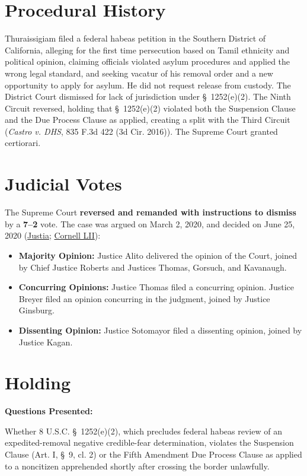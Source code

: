 \documentclass[12pt]{article}
\begin{document}
\section{Procedural History}
Thuraissigiam filed a federal habeas petition in the Southern District of California, alleging for the first time persecution based on Tamil ethnicity and political opinion, claiming officials violated asylum procedures and applied the wrong legal standard, and seeking vacatur of his removal order and a new opportunity to apply for asylum. He did not request release from custody. The District Court dismissed for lack of jurisdiction under \S\ 1252(e)(2). The Ninth Circuit reversed, holding that \S\ 1252(e)(2) violated both the Suspension Clause and the Due Process Clause as applied, creating a split with the Third Circuit (\textit{Castro v. DHS}, 835 F.3d 422 (3d Cir. 2016)). The Supreme Court granted certiorari.

\section{Judicial Votes}
The Supreme Court \textbf{reversed and remanded with instructions to dismiss} by a \textbf{7--2} vote. The case was argued on March 2, 2020, and decided on June 25, 2020 (\href{https://supreme.justia.com/cases/federal/us/591/19-161/}{Justia}; \href{https://www.law.cornell.edu/supremecourt/text/19-161}{Cornell LII}):

\begin{itemize}
    \item \textbf{Majority Opinion:} Justice Alito delivered the opinion of the Court, joined by Chief Justice Roberts and Justices Thomas, Gorsuch, and Kavanaugh.
    \item \textbf{Concurring Opinions:} Justice Thomas filed a concurring opinion. Justice Breyer filed an opinion concurring in the judgment, joined by Justice Ginsburg.
    \item \textbf{Dissenting Opinion:} Justice Sotomayor filed a dissenting opinion, joined by Justice Kagan.
\end{itemize}

\section{Holding}
\textbf{Questions Presented:}

Whether 8 U.S.C. \S\ 1252(e)(2), which precludes federal habeas review of an expedited-removal negative credible-fear determination, violates the Suspension Clause (Art. I, \S\ 9, cl. 2) or the Fifth Amendment Due Process Clause as applied to a noncitizen apprehended shortly after crossing the border unlawfully.
\end{document}
